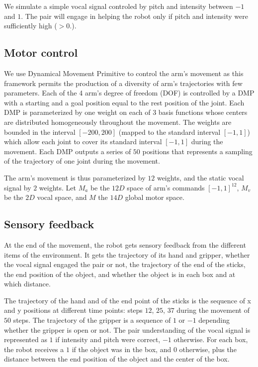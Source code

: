 \documentclass[conference]{include/IEEEtran}
\begin{document}
		We simulate a simple vocal signal controled by pitch and intensity between $-1$ and $1$.
		The pair will engage in helping the robot only if pitch and intensity were sufficiently high ($>0.$).
	
	\subsection{Motor control}
	
		We use Dynamical Movement Primitive \cite{ijspeert_dynamical_2013} to control the arm's movement as this framework permits the production of a diversity of arm's trajectories with few parameters.
		Each of the 4 arm's degree of freedom (DOF) is controlled by a DMP with a starting and a goal position equal to the rest position of the joint.
		Each DMP is parameterized by one weight on each of 3 basis functions whose centers are distributed homogeneously throughout the movement.
		The weights are bounded in the interval $[-200,200]$ (mapped to the standard interval $[-1,1]$) which allow each joint to cover its standard interval $[-1,1]$ during the movement.
		Each DMP outputs a series of $50$ positions that represents a sampling of the trajectory of one joint during the movement.
	
		The arm's movement is thus parameterized by $12$ weights, and the static vocal signal by $2$ weights.
		Let $M_a$ be the $12D$ space of arm's commands $[-1,1]^{12}$, $M_v$ be the $2D$ vocal space, and $M$ the $14D$ global motor space.
	
	
	\subsection{Sensory feedback}
	
		At the end of the movement, the robot gets sensory feedback from the different items of the environment.
		It gets the trajectory of its hand and gripper, whether the vocal signal engaged the pair or not, the trajectory of the end of the sticks, 
		the end position of the object, and whether the object is in each box and at which distance.
	
		The trajectory of the hand and of the end point of the sticks is the sequence of x and y positions at different time points: steps $12$, $25$, $37$ during the movement of $50$ steps.
		The trajectory of the gripper is a sequence of $1$ or $-1$ depending whether the gripper is open or not.
		The pair understanding of the vocal signal is represented as $1$ if intensity and pitch were correct, $-1$ otherwise.
		For each box, the robot receives a $1$ if the object was in the box, and $0$ otherwise, plus the distance between the end position of the object and the center of the box.
		 
\end{document}
